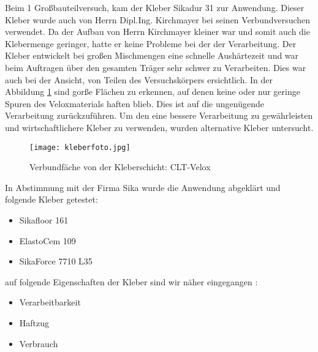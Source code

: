 \documentclass[12 pt,a4 paper ]{scrreprt}
\begin{document}
Beim 1 Großbauteilversuch, kam der Kleber Sikadur 31 zur Anwendung. Dieser Kleber wurde auch von Herrn Dipl.Ing. Kirchmayer bei seinen Verbundversuchen verwendet. Da der Aufbau von Herrn Kirchmayer kleiner war und somit auch die Klebermenge geringer, hatte er keine Probleme bei der der Verarbeitung. Der Kleber entwickelt bei großen Mischmengen eine schnelle Aushärtezeit und war beim Auftragen über den gesamten Träger sehr schwer zu Verarbeiten. Dies war auch bei der Ansicht, von Teilen des Versuchskörpers ersichtlich. In der Abbildung \ref{kleberfoto} sind gorße Flächen zu erkennen, auf denen keine oder nur geringe Spuren des Veloxmaterials haften blieb. Dies ist auf die ungenügende Verarbeitung zurückzuführen. Um den eine bessere Verarbeitung zu gewährleisten und wirtschaftlichere Kleber zu verwenden, wurden alternative Kleber untersucht. 
\begin{figure}[h]
\begin{center}
\texttt{[image: kleberfoto.jpg]}
\caption{ Verbundfäche von der Kleberschicht: CLT-Velox}
\label{kleberfoto}
\end{center}
\end{figure}



In Abstimmung mit der Firma Sika wurde die Anwendung abgeklärt und folgende Kleber getestet:
\begin{itemize}
\item Sikafloor 161
\item ElastoCem 109
\item SikaForce 7710 L35
\end{itemize}


auf folgende Eigenschaften der Kleber sind wir näher eingegangen :	

\begin{itemize}
\item Verarbeitbarkeit
\item Haftzug
\item Verbrauch
\end{itemize}
\end{document}
